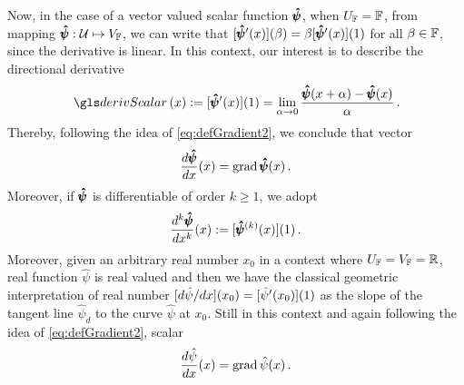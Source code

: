 Now, in the case of a vector valued scalar function $\pmb{\hat{\psi}}$, when $U_{\mathbb{F}}=\mathbb{F}$, from mapping $\pmb{\hat{\psi}} : \mathcal{U} \mapsto V_{\mathbb{F}}$, we can write that $[\pmb{\hat{\psi}}'(x)](\beta) = \beta[\pmb{\hat{\psi}}'(x)](1)$ for all $\beta\in\mathbb{F}$, since the derivative is linear. In this context, our interest is to describe the directional derivative  
\begin{equation}\label{eq:derivVecScaFun}
\fua{\gloref{derivScalar}}{x} := \fua{[\tnr{\hat{\psi}}'(x)]}{1} = \lim_{\alpha\to 0} \dfrac{\fua{\tnr{\hat{\psi}}}{x+\alpha}-\fua{\tnr{\hat{\psi}}}{x}}{\alpha}\,. 
\end{equation} 
Thereby, following the idea of \eqref{eq:defGradient2}, we conclude that vector
\begin{equation}\label{eq:gradvectFun}
\dfrac{d\pmb{\hat{\psi}}}{dx}(x) = \operatorname{grad}{\pmb{\hat{\psi}}}(x) \,.
\end{equation}
Moreover, if $\pmb{\hat{\psi}}$ is differentiable of order $k\geqslant 1$, we adopt  
\begin{equation}
\dfrac{d^k\pmb{\hat{\psi}}}{dx^k}(x):=[\pmb{\hat{\psi}}^{(k)}(x)](1)\,.
\end{equation} 
Moreover, given an arbitrary real number $x_0$ in a context where $U_{\mathbb{F}}=V_{\mathbb{F}}=\mathbb{R}$, real function $\hat{\psi}$ is real valued and then we have the classical geometric interpretation of real number $[d{\hat{\psi}}/dx](x_0)=[{\hat{\psi}}'(x_0)](1)$ as the slope of the tangent line ${\hat{\psi}}_\mathit{d}$ to the curve ${\hat{\psi}}$ at $x_0$. Still in this context and again following the idea of \eqref{eq:defGradient2}, scalar
\begin{equation}
\dfrac{d{\hat{\psi}}}{dx}(x)=\operatorname{grad}{{\hat{\psi}}(x)}\,.
\end{equation}

